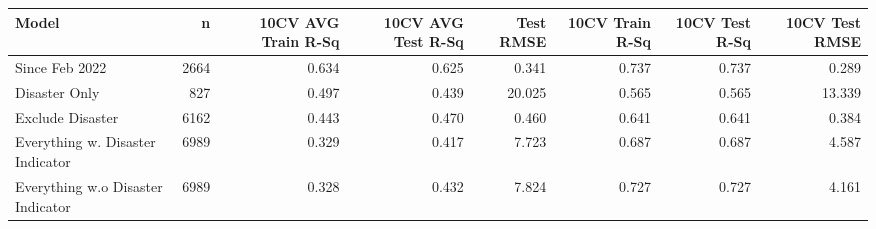 
\begin{tabular}{l|r|r|r|r|r|r|r}
\hline
Model & n & 10CV AVG Train R-Sq & 10CV AVG Test R-Sq & Test RMSE & 10CV Train R-Sq & 10CV Test R-Sq & 10CV Test RMSE\\
\hline
Since Feb 2022 & 2664 & 0.634 & 0.625 & 0.341 & 0.737 & 0.737 & 0.289\\
\hline
Disaster Only & 827 & 0.497 & 0.439 & 20.025 & 0.565 & 0.565 & 13.339\\
\hline
Exclude Disaster & 6162 & 0.443 & 0.470 & 0.460 & 0.641 & 0.641 & 0.384\\
\hline
Everything w. Disaster Indicator & 6989 & 0.329 & 0.417 & 7.723 & 0.687 & 0.687 & 4.587\\
\hline
Everything w.o Disaster Indicator & 6989 & 0.328 & 0.432 & 7.824 & 0.727 & 0.727 & 4.161\\
\hline
\end{tabular}
